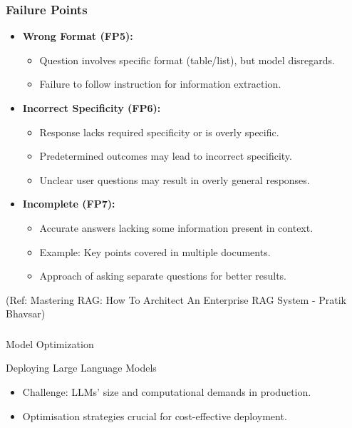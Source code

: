 \begin{frame}[fragile]\frametitle{Failure Points}
\begin{itemize}
  
  \item \textbf{Wrong Format (FP5):}
    \begin{itemize}
        \item Question involves specific format (table/list), but model disregards.
        \item Failure to follow instruction for information extraction.
    \end{itemize}
  
  \item \textbf{Incorrect Specificity (FP6):}
    \begin{itemize}
        \item Response lacks required specificity or is overly specific.
        \item Predetermined outcomes may lead to incorrect specificity.
        \item Unclear user questions may result in overly general responses.
    \end{itemize}
  
  \item \textbf{Incomplete (FP7):}
    \begin{itemize}
        \item Accurate answers lacking some information present in context.
        \item Example: Key points covered in multiple documents.
        \item Approach of asking separate questions for better results.
    \end{itemize}
\end{itemize}

{\tiny (Ref: Mastering RAG: How To Architect An Enterprise RAG System - Pratik Bhavsar)}

\end{frame}



\begin{frame}[fragile]\frametitle{}
\begin{center}
{\Large Model Optimization}
\end{center}
\end{frame}


\begin{frame}[fragile]{Deploying Large Language Models}
  \begin{itemize}
    \item Challenge: LLMs' size and computational demands in production.
    \item Optimisation strategies crucial for cost-effective deployment.
  \end{itemize}
\end{frame}

